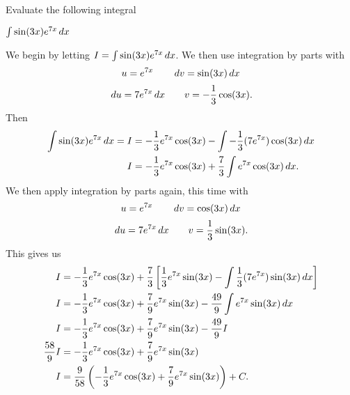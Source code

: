 \documentclass[noinstructornotes]{ximera}
\begin{document}
\begin{problem}

Evaluate the following integral

	$\int \sin(3x) e^{7x} \,d x$
	\begin{freeResponse}
	We begin by letting $I = \int \sin(3x) e^{7x} \,d x$.  
	We then use integration by parts with
		{\color{red}
		\[
		u = e^{7x} \qquad \,d v = \sin(3x) \,d x
		\]
		\[
		\,d u = 7e^{7x} \,d x \qquad v = -\frac{1}{3} \cos(3x).
		\]
		}
	Then
		\begin{align*}
		\int \sin(3x) e^{7x} \,d x = I
		&= -\frac{1}{3} e^{7x} \cos(3x) - \int -\frac{1}{3} (7e^{7x}) \cos(3x) \,d x  \\
		I &= -\frac{1}{3} e^{7x} \cos(3x) + \frac{7}{3} \int e^{7x} \cos(3x) \,d x.
		\end{align*}
	We then apply integration by parts again, this time with
		{\color{red}
		\[
		u = e^{7x} 		\qquad	\,d v = \cos(3x) \,d x
		\]
		\[
		\,d u = 7e^{7x} \,d x 	\qquad	v = \frac{1}{3} \sin(3x).
		\]
		}
	This gives us
		\begin{align*}
		I &= -\frac{1}{3} e^{7x} \cos(3x) + \frac{7}{3} \left[ \frac{1}{3} e^{7x} \sin(3x) - \int \frac{1}{3} (7e^{7x}) \sin(3x) \,d x \right]  \\
		I &= -\frac{1}{3} e^{7x} \cos(3x) + \frac{7}{9} e^{7x} \sin(3x) - \frac{49}{9} \int e^{7x} \sin(3x) \,d x  \\
		I &= -\frac{1}{3} e^{7x} \cos(3x) + \frac{7}{9} e^{7x} \sin(3x) - \frac{49}{9} I  \\
		\frac{58}{9} I &= -\frac{1}{3} e^{7x} \cos(3x) + \frac{7}{9} e^{7x} \sin(3x)  \\
		I &= \frac{9}{58} \left( -\frac{1}{3} e^{7x} \cos(3x) + \frac{7}{9} e^{7x} \sin(3x) \right) + C.
		\end{align*}
	\end{freeResponse}

\end{problem}
\end{document}
